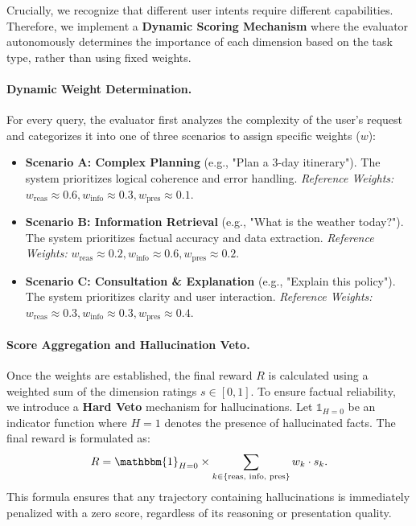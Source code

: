 \documentclass{article} %
\begin{document}
Crucially, we recognize that different user intents require different capabilities. Therefore, we implement a \textbf{Dynamic Scoring Mechanism} where the evaluator autonomously determines the importance of each dimension based on the task type, rather than using fixed weights.

\paragraph{Dynamic Weight Determination.} For every query, the evaluator first analyzes the complexity of the user's request and categorizes it into one of three scenarios to assign specific weights ($w$):
\begin{itemize}
    \item \textbf{Scenario A: Complex Planning} (e.g., "Plan a 3-day itinerary"). The system prioritizes logical coherence and error handling. 
    \textit{Reference Weights:} $w_{\text{reas}} \approx 0.6, w_{\text{info}} \approx 0.3, w_{\text{pres}} \approx 0.1$.
    \item \textbf{Scenario B: Information Retrieval} (e.g., "What is the weather today?"). The system prioritizes factual accuracy and data extraction. 
    \textit{Reference Weights:} $w_{\text{reas}} \approx 0.2, w_{\text{info}} \approx 0.6, w_{\text{pres}} \approx 0.2$.
    \item \textbf{Scenario C: Consultation \& Explanation} (e.g., "Explain this policy"). The system prioritizes clarity and user interaction. 
    \textit{Reference Weights:} $w_{\text{reas}} \approx 0.3, w_{\text{info}} \approx 0.3, w_{\text{pres}} \approx 0.4$.
\end{itemize}

\paragraph{Score Aggregation and Hallucination Veto.}
Once the weights are established, the final reward $R$ is calculated using a weighted sum of the dimension ratings $s \in [0, 1]$. To ensure factual reliability, we introduce a \textbf{Hard Veto} mechanism for hallucinations. Let $\mathbb{1}_{H=0}$ be an indicator function where $H=1$ denotes the presence of hallucinated facts. The final reward is formulated as:
\begin{equation}
R = \mathbbm{1}_{H=0} \times \sum_{k \in \{\text{reas, info, pres}\}} w_k \cdot s_k.
\end{equation}
This formula ensures that any trajectory containing hallucinations is immediately penalized with a zero score, regardless of its reasoning or presentation quality.
\end{document}
